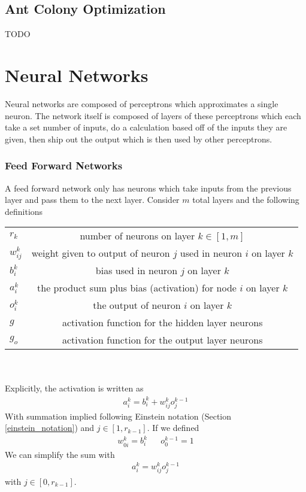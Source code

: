 \subsection{Ant Colony Optimization}
TODO

\section{Neural Networks}
Neural networks are composed of perceptrons which approximates a single neuron. The network itself is composed of layers of these perceptrons which each take a set number of inputs, do a calculation based off of the inputs they are given, then ship out the output which is then used by other perceptrons.

\subsubsection{Feed Forward Networks}
A feed forward network only has neurons which take inputs from the previous layer and pass them to the next layer. Consider $m$ total layers and the following definitions \cite{brilliant_backpropagation}
\\
\begin{tabular}{ l c }
  $r_k$ & number of neurons on layer $k\in[1,m]$\\
  $w_{ij}^k$ & weight given to output of neuron $j$ used in neuron $i$ on layer $k$  \\
  $b_i^k$ & bias used in neuron $j$ on layer $k$   \\
  $a_i^k$ & the product sum plus bias (activation) for node $i$ on layer $k$  \\
  $o_i^k$ & the output of neuron $i$ on layer $k$ \\
  $g$ & activation function for the hidden layer neurons \\
  $g_o$ & activation function for the output layer neurons \\
\end{tabular}\\
\\
Explicitly, the activation is written as
\begin{align}
	a_i^k =b_i^k + w_{ij}^ko_j^{k-1}
\end{align}
With summation implied following Einstein notation (Section \ref{einstein_notation}) and $j\in [1,r_{k-1}]$. If we defined 
\begin{align}
	w^k_{0i}=b_i^k && o_0^{k-1}=1
\end{align}
We can simplify the sum with
\begin{align}\label{nn_activation}
	a_i^k = w_{ij}^ko_j^{k-1}
\end{align}
with $j\in [0,r_{k-1}]$.

